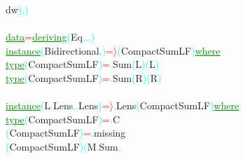 {\rm{}dw}\textcolor{cyan}{)}\textcolor{cyan}{,}\textcolor{cyan}{)}\\\\\textcolor{green}{\underline{data}}\hsspace \textcolor{red}{=}\hsspace \textcolor{green}{\underline{deriving}}\hsspace \textcolor{cyan}{(}{\rm{}Eq}\textcolor{cyan}{,}\textcolor{cyan}{,}\textcolor{cyan}{,}\textcolor{cyan}{)}\\\textcolor{green}{\underline{instance}}\hsspace \textcolor{cyan}{(}{\rm{}Bidirectional}\textcolor{cyan}{,}\textcolor{cyan}{)}\hsspace \textcolor{red}{=\ensuremath{\rangle}}\hsspace \textcolor{cyan}{(}{\rm{}CompactSumLF}\textcolor{cyan}{)}\hsspace \textcolor{green}{\underline{where}}\\\hstab \textcolor{green}{\underline{type}}\hsspace \textcolor{cyan}{(}{\rm{}CompactSumLF}\textcolor{cyan}{)}\hsspace \textcolor{red}{=}\textcolor{cyan}{.}{\rm{}Sum}\hsspace \textcolor{cyan}{(}{\rm{}L}\textcolor{cyan}{)}\hsspace \textcolor{cyan}{(}{\rm{}L}\textcolor{cyan}{)}\\\hstab \textcolor{green}{\underline{type}}\hsspace \textcolor{cyan}{(}{\rm{}CompactSumLF}\textcolor{cyan}{)}\hsspace \textcolor{red}{=}\textcolor{cyan}{.}{\rm{}Sum}\hsspace \textcolor{cyan}{(}{\rm{}R}\textcolor{cyan}{)}\hsspace \textcolor{cyan}{(}{\rm{}R}\textcolor{cyan}{)}\\\\\textcolor{green}{\underline{instance}}\hsspace \textcolor{cyan}{(}{\rm{}L}\textcolor{cyan}{.}{\rm{}Lens}\textcolor{cyan}{,}\textcolor{cyan}{.}{\rm{}Lens}\textcolor{cyan}{)}\hsspace \textcolor{red}{=\ensuremath{\rangle}}\textcolor{cyan}{.}{\rm{}Lens}\hsspace \textcolor{cyan}{(}{\rm{}CompactSumLF}\textcolor{cyan}{)}\hsspace \textcolor{green}{\underline{where}}\\\hstab \textcolor{green}{\underline{type}}\hsspace \hsspace \textcolor{cyan}{(}{\rm{}CompactSumLF}\textcolor{cyan}{)}\hsspace \textcolor{red}{=}\textcolor{cyan}{.}{\rm{}C}\\\hsspace \textcolor{cyan}{(}{\rm{}CompactSumLF}\textcolor{cyan}{)}\hsspace \textcolor{red}{=}\textcolor{cyan}{.}{\rm{}missing}\\\hsspace \textcolor{cyan}{(}{\rm{}CompactSumLF}\textcolor{cyan}{)}\hsspace \textcolor{cyan}{(}{\rm{}M}\textcolor{cyan}{.}{\rm{}Sum}\textcolor{cyan}{,}\hsspace 